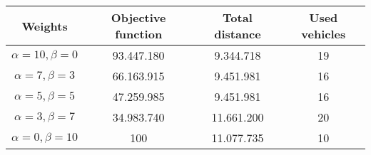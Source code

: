 {
\renewcommand{\arraystretch}{2}
\begin{longtable}[h]{| c | c | c | c |}
    \hline
    \textbf{Weights} & \textbf{Objective function} & \textbf{Total distance} & \textbf{Used vehicles} \\
    \hline
    \endhead
    $\alpha = 10, \beta = 0$ & 93.447.180 &  9.344.718 & 19 \\
    \hline
    $\alpha = 7, \beta = 3$  & 66.163.915 &  9.451.981 & 16 \\
    \hline
    $\alpha = 5, \beta = 5$  & 47.259.985 &  9.451.981 & 16 \\
    \hline
    $\alpha = 3, \beta = 7$  & 34.983.740 & 11.661.200 & 20 \\
    \hline
    $\alpha = 0, \beta = 10$ &        100 & 11.077.735 & 10 \\
    \hline
\end{longtable}
}
